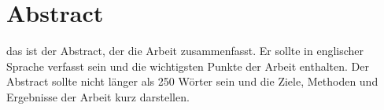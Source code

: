 
\chapter*{Abstract}\label{cha:Abstract}

\thispagestyle{empty} %
\begin{center}
das ist der Abstract, der die Arbeit zusammenfasst. Er sollte in englischer Sprache verfasst sein und die wichtigsten Punkte der Arbeit enthalten. Der Abstract sollte nicht länger als 250 Wörter sein und die Ziele, Methoden und Ergebnisse der Arbeit kurz darstellen.
\end{center}